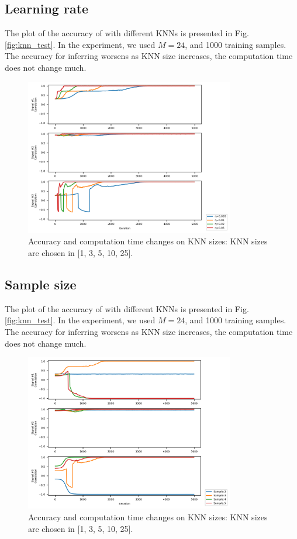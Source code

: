 \documentclass[conference]{IEEEtran}
\begin{document}
\subsection{Learning rate}

The plot of the accuracy of with different KNNs is presented in Fig. \ref{fig:knn_test}.
In the experiment, we used $M=24$, and 1000 training samples.
The accuracy for inferring worsens as KNN size increases, the computation time does not change much.

\begin{figure}[!t]
	\centering
	\includegraphics[width=3.6in]{eta_test.png}	
	\caption{Accuracy and computation time changes on KNN sizes: KNN sizes are chosen in [1, 3, 5, 10, 25].}
	\label{fig:eta_test}
\end{figure}



\subsection{Sample size}

The plot of the accuracy of with different KNNs is presented in Fig. \ref{fig:knn_test}.
In the experiment, we used $M=24$, and 1000 training samples.
The accuracy for inferring worsens as KNN size increases, the computation time does not change much.

\begin{figure}[!t]
	\centering
	\includegraphics[width=3.6in]{sample_test.png}	
	\caption{Accuracy and computation time changes on KNN sizes: KNN sizes are chosen in [1, 3, 5, 10, 25].}
	\label{fig:eta_test}
\end{figure}
\end{document}
